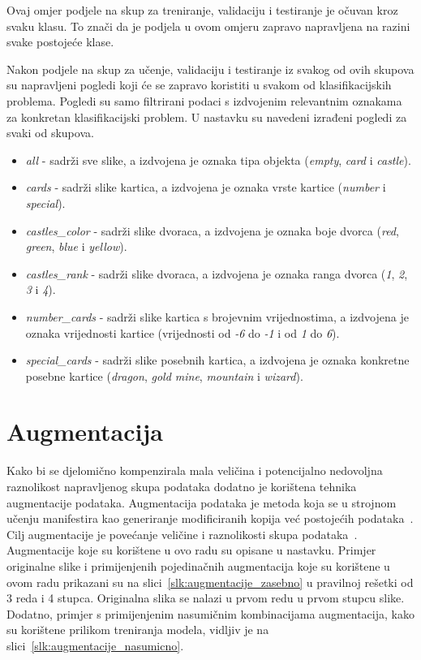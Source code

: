 \documentclass[diplomskirad]{fer}
\begin{document}
			Ovaj omjer podjele na skup za treniranje, validaciju i testiranje je očuvan kroz svaku klasu. To znači da je podjela u ovom omjeru zapravo napravljena na razini svake postojeće klase.
			
			Nakon podjele na skup za učenje, validaciju i testiranje iz svakog od ovih skupova su napravljeni pogledi koji će se zapravo koristiti u svakom od klasifikacijskih problema. Pogledi su samo filtrirani podaci s izdvojenim relevantnim oznakama za konkretan klasifikacijski problem. U nastavku su navedeni izrađeni pogledi za svaki od skupova.
			\begin{itemize}
				\item \textit{all} - sadrži sve slike, a izdvojena je oznaka tipa objekta (\textit{empty}, \textit{card} i \textit{castle}).
				\item \textit{cards} - sadrži slike kartica, a izdvojena je oznaka vrste kartice (\textit{number} i \textit{special}).
				\item \textit{castles\_color} - sadrži slike dvoraca, a izdvojena je oznaka boje dvorca (\textit{red}, \textit{green}, \textit{blue} i \textit{yellow}).
				\item \textit{castles\_rank} - sadrži slike dvoraca, a izdvojena je oznaka ranga dvorca (\textit{1}, \textit{2}, \textit{3} i \textit{4}).
				\item \textit{number\_cards} - sadrži slike kartica s brojevnim vrijednostima, a izdvojena je oznaka vrijednosti kartice (vrijednosti od \textit{-6} do \textit{-1} i od \textit{1} do \textit{6}).
				\item \textit{special\_cards} - sadrži slike posebnih kartica, a izdvojena je oznaka konkretne posebne kartice (\textit{dragon}, \textit{gold mine}, \textit{mountain} i \textit{wizard}).
			\end{itemize}
	
	\section{Augmentacija}
	\label{pog:augmentacija}
		Kako bi se djelomično kompenzirala mala veličina i potencijalno nedovoljna raznolikost napravljenog skupa podataka dodatno je korištena tehnika augmentacije podataka. Augmentacija podataka je metoda koja se u strojnom učenju manifestira kao generiranje modificiranih kopija već postojećih podataka~\cite{IBMDataAugmentation}. Cilj augmentacije je povećanje veličine i raznolikosti skupa podataka~\cite{IBMDataAugmentation}. Augmentacije koje su korištene u ovo radu su opisane u nastavku. Primjer originalne slike i primijenjenih pojedinačnih augmentacija koje su korištene u ovom radu prikazani su na slici~\ref{slk:augmentacije_zasebno} u pravilnoj rešetki od 3 reda i 4 stupca. Originalna slika se nalazi u prvom redu u prvom stupcu slike. Dodatno, primjer s primijenjenim nasumičnim kombinacijama augmentacija, kako su korištene prilikom treniranja modela, vidljiv je na slici~\ref{slk:augmentacije_nasumicno}. 
		
\end{document}
